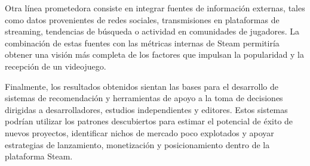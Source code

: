 \documentclass[conference]{IEEEtran}
\begin{document}
Otra línea prometedora consiste en integrar fuentes de información externas, tales como datos provenientes de redes sociales, transmisiones en plataformas de streaming, tendencias de búsqueda o actividad en comunidades de jugadores. La combinación de estas fuentes con las métricas internas de Steam permitiría obtener una visión más completa de los factores que impulsan la popularidad y la recepción de un videojuego.

Finalmente, los resultados obtenidos sientan las bases para el desarrollo de sistemas de recomendación y herramientas de apoyo a la toma de decisiones dirigidas a desarrolladores, estudios independientes y editores. Estos sistemas podrían utilizar los patrones descubiertos para estimar el potencial de éxito de nuevos proyectos, identificar nichos de mercado poco explotados y apoyar estrategias de lanzamiento, monetización y posicionamiento dentro de la plataforma Steam.

\nocite{*}


\end{document}
